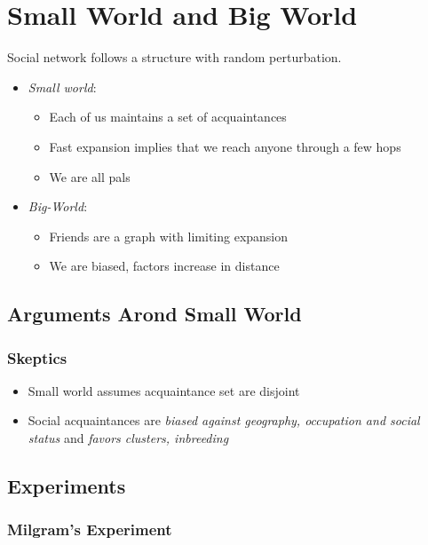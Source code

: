 \chapter{Small World and Big World}

  Social network follows a structure with random perturbation.

  \begin{itemize}
    \item \emph{Small world}:
    \begin{itemize}
      \item Each of us maintains a set of acquaintances
      \item Fast expansion implies that we reach anyone through a few hops
      \item We are all pals
    \end{itemize}

    \item \emph{Big-World}:
    \begin{itemize}
      \item Friends are a graph with limiting expansion
      \item We are biased, factors increase in distance
    \end{itemize}
  \end{itemize}

\section{Arguments Arond Small World}

  \subsection{Skeptics}

    \begin{itemize}
      \item Small world assumes acquaintance set are disjoint
      \item Social acquaintances are \emph{biased against geography, occupation
      and social status} and \emph{favors clusters, inbreeding}
    \end{itemize}

\section{Experiments}

  \subsection{Milgram's Experiment}

